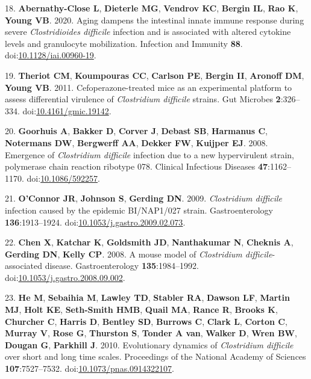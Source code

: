 \documentclass[
  12pt,
]{article}
\newenvironment{cslreferences}%
  {}%
  {\par}
\begin{document}
\begin{cslreferences}
\leavevmode\hypertarget{ref-AbernathyClose2020}{}%
18. \textbf{Abernathy-Close L}, \textbf{Dieterle MG}, \textbf{Vendrov
KC}, \textbf{Bergin IL}, \textbf{Rao K}, \textbf{Young VB}. 2020. Aging
dampens the intestinal innate immune response during severe
\emph{Clostridioides difficile} infection and is associated with altered
cytokine levels and granulocyte mobilization. Infection and Immunity
\textbf{88}.
doi:\href{https://doi.org/10.1128/iai.00960-19}{10.1128/iai.00960-19}.

\leavevmode\hypertarget{ref-Theriot2011}{}%
19. \textbf{Theriot CM}, \textbf{Koumpouras CC}, \textbf{Carlson PE},
\textbf{Bergin II}, \textbf{Aronoff DM}, \textbf{Young VB}. 2011.
Cefoperazone-treated mice as an experimental platform to assess
differential virulence of \emph{Clostridium difficile} strains. Gut
Microbes \textbf{2}:326--334.
doi:\href{https://doi.org/10.4161/gmic.19142}{10.4161/gmic.19142}.

\leavevmode\hypertarget{ref-Goorhuis2008}{}%
20. \textbf{Goorhuis A}, \textbf{Bakker D}, \textbf{Corver J},
\textbf{Debast SB}, \textbf{Harmanus C}, \textbf{Notermans DW},
\textbf{Bergwerff AA}, \textbf{Dekker FW}, \textbf{Kuijper EJ}. 2008.
Emergence of \emph{Clostridium difficile} infection due to a new
hypervirulent strain, polymerase chain reaction ribotype 078. Clinical
Infectious Diseases \textbf{47}:1162--1170.
doi:\href{https://doi.org/10.1086/592257}{10.1086/592257}.

\leavevmode\hypertarget{ref-OConnor2009}{}%
21. \textbf{O'Connor JR}, \textbf{Johnson S}, \textbf{Gerding DN}. 2009.
\emph{Clostridium difficile} infection caused by the epidemic
BI/NAP1/027 strain. Gastroenterology \textbf{136}:1913--1924.
doi:\href{https://doi.org/10.1053/j.gastro.2009.02.073}{10.1053/j.gastro.2009.02.073}.

\leavevmode\hypertarget{ref-Chen2008}{}%
22. \textbf{Chen X}, \textbf{Katchar K}, \textbf{Goldsmith JD},
\textbf{Nanthakumar N}, \textbf{Cheknis A}, \textbf{Gerding DN},
\textbf{Kelly CP}. 2008. A mouse model of \emph{Clostridium
difficile}-associated disease. Gastroenterology \textbf{135}:1984--1992.
doi:\href{https://doi.org/10.1053/j.gastro.2008.09.002}{10.1053/j.gastro.2008.09.002}.

\leavevmode\hypertarget{ref-He2010}{}%
23. \textbf{He M}, \textbf{Sebaihia M}, \textbf{Lawley TD},
\textbf{Stabler RA}, \textbf{Dawson LF}, \textbf{Martin MJ},
\textbf{Holt KE}, \textbf{Seth-Smith HMB}, \textbf{Quail MA},
\textbf{Rance R}, \textbf{Brooks K}, \textbf{Churcher C}, \textbf{Harris
D}, \textbf{Bentley SD}, \textbf{Burrows C}, \textbf{Clark L},
\textbf{Corton C}, \textbf{Murray V}, \textbf{Rose G}, \textbf{Thurston
S}, \textbf{Tonder A van}, \textbf{Walker D}, \textbf{Wren BW},
\textbf{Dougan G}, \textbf{Parkhill J}. 2010. Evolutionary dynamics of
\emph{Clostridium difficile} over short and long time scales.
Proceedings of the National Academy of Sciences \textbf{107}:7527--7532.
doi:\href{https://doi.org/10.1073/pnas.0914322107}{10.1073/pnas.0914322107}.


\end{cslreferences}
\end{document}
